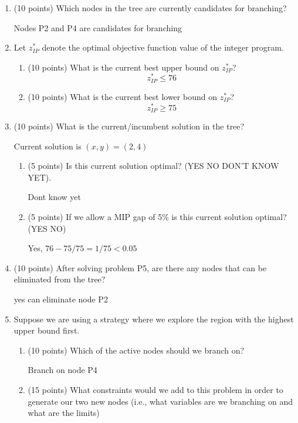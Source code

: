 \documentclass[letterpaper,oneside,12pt]{article}%
\newcommand{\blu}{\color{blue}}
\begin{document}
\begin{enumerate}
\item (10 points) Which nodes in the tree are currently candidates for branching? 

{\blu
Nodes P2 and P4 are candidates for branching
}

\vfill
\item Let $z^*_{IP}$ denote the optimal objective function value of the integer program. 
	\begin{enumerate}
	\item (10 points) What is the current best upper bound on $z^*_{IP}$? 
	{\blu
	\[
	z^*_{IP} \leq 76
	\]
	}	
	\vfill
	\item (10 points) What is the current best lower bound on $z^*_{IP}$? 
{\blu
\[
z^*_{IP} \geq 75
\]
}	
	\vfill
	\end{enumerate}	 
\newpage
\item (10 points) What is the current/incumbent solution in the tree? 

{\blu
Current solution is $(x,y) = (2,4)$
}
\vfill
	\begin{enumerate}
	\item (5 points) Is this current solution optimal? (YES \hspace{0.5cm} NO \hspace{0.5cm} DON'T KNOW YET).

{\blu
Dont know yet
}
 \vfill
	\item (5 points) If we allow a MIP gap of 5\% is this current solution optimal? (YES \hspace{0.5cm} NO)

{\blu
Yes, $76-75/75 = 1/75 < 0.05$
} 
\vfill
	\end{enumerate}
\item (10 points) After solving problem P5, are there any nodes that can be eliminated from the tree? 

{\blu
yes can eliminate node P2
}\vfill
\item Suppose we are using a strategy where we explore the region with the highest upper bound first.
	\begin{enumerate}
	\item (10 points) Which of the active nodes should we branch on? 

{\blu
Branch on node P4
}	
	\vfill
	\item (15 points) What constraints would we add to this problem in order to generate our two new nodes (i.e., what variables are we branching on and what are the limits) 


\end{enumerate}
\end{enumerate}
\end{document}
